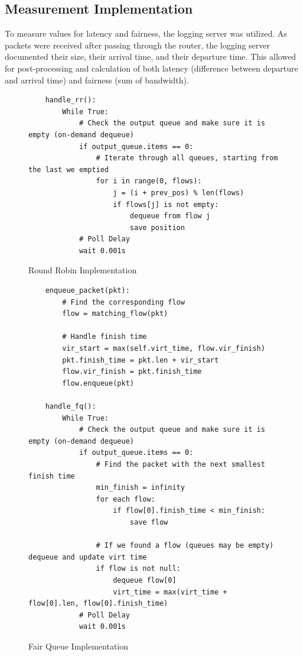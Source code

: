\documentclass[conference]{IEEEtran}
\begin{document}
\subsection{Measurement Implementation}
To measure values for latency and fairness, the logging server was utilized.
As packets were received after passing through the router, the logging server documented their size, their arrival time, and their departure time.
This allowed for post-processing and calculation of both latency (difference between departure and arrival time) and fairness (sum of bandwidth).

\begin{figure}[tbp]
    \begin{lstlisting}
    handle_rr():
        While True:
            # Check the output queue and make sure it is empty (on-demand dequeue)
            if output_queue.items == 0:
                # Iterate through all queues, starting from the last we emptied
                for i in range(0, flows):
                    j = (i + prev_pos) % len(flows)
                    if flows[j] is not empty:
                        dequeue from flow j
                        save position
            # Poll Delay
            wait 0.001s
    \end{lstlisting}
    \caption{Round Robin Implementation}
    \label{fig:rr_impl}
\end{figure}

\begin{figure}[tbp]
    \begin{lstlisting}
    enqueue_packet(pkt):
        # Find the corresponding flow
        flow = matching_flow(pkt)

        # Handle finish time
        vir_start = max(self.virt_time, flow.vir_finish)
        pkt.finish_time = pkt.len + vir_start
        flow.vir_finish = pkt.finish_time
        flow.enqueue(pkt)

    handle_fq():
        While True:
            # Check the output queue and make sure it is empty (on-demand dequeue)
            if output_queue.items == 0:
                # Find the packet with the next smallest finish time
                min_finish = infinity
                for each flow:
                    if flow[0].finish_time < min_finish:
                        save flow

                # If we found a flow (queues may be empty) dequeue and update virt time
                if flow is not null:
                    dequeue flow[0]
                    virt_time = max(virt_time + flow[0].len, flow[0].finish_time)
            # Poll Delay
            wait 0.001s
    \end{lstlisting}
    \caption{Fair Queue Implementation}
    \label{fig:fq_impl}
\end{figure}
\clearpage
\end{document}
